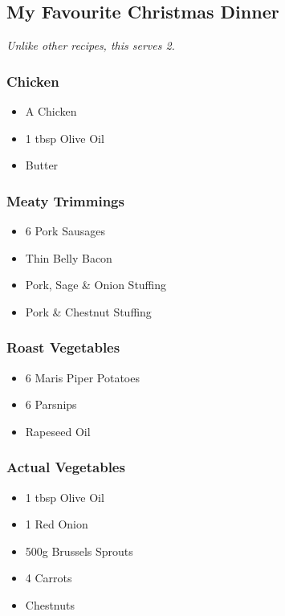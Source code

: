 \documentclass[11pt, english]{article}
\begin{document}
\newpage

	\subsection{My Favourite Christmas Dinner}

	\textit{Unlike other recipes, this serves 2.}

		\subsubsection*{Chicken}

	\begin{itemize}
        \setlength\itemsep{0cm}
		\item A Chicken
		\item 1 tbsp Olive Oil
		\item Butter
	\end{itemize}

		\subsubsection*{Meaty Trimmings}

	\begin{itemize}
        \setlength\itemsep{0cm}
		\item 6 Pork Sausages
		\item Thin Belly Bacon
		\item Pork, Sage \& Onion Stuffing
		\item Pork \& Chestnut Stuffing
	\end{itemize}

		\subsubsection*{Roast Vegetables}

	\begin{itemize}
        \setlength\itemsep{0cm}
		\item 6 Maris Piper Potatoes
		\item 6 Parsnips
		\item Rapeseed Oil 
	\end{itemize}

		\subsubsection*{Actual Vegetables}

	\begin{itemize}
        \setlength\itemsep{0cm}
		\item 1 tbsp Olive Oil
		\item 1 Red Onion
		\item 500g Brussels Sprouts
		\item 4 Carrots
		\item Chestnuts
	\end{itemize}
\end{document}
